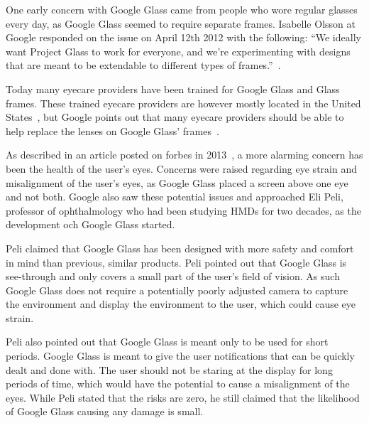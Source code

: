 One early concern with Google Glass came from people who wore regular glasses every day, as Google Glass seemed to require separate frames. Isabelle Olsson at Google responded on the issue on April 12th 2012 with the following: ``We ideally want Project Glass to work for everyone, and we're experimenting with designs that are meant to be extendable to different types of frames.''~\cite{GoogleGlassFrameResponse}.

Today many eyecare providers have been trained for Google Glass and Glass frames. These trained eyecare providers are however mostly located in the United States~\cite{frameProviders}, but Google points out that many eyecare providers should be able to help replace the lenses on Google Glass' frames~\cite{framesGlass}.

As described in an article posted on forbes in 2013~\cite{ackerman13}, a more alarming concern has been the health of the user's eyes. Concerns were raised regarding eye strain and misalignment of the user's eyes, as Google Glass placed a screen above one eye and not both. Google also saw these potential issues and approached Eli Peli, professor of ophthalmology who had been studying HMDs for two decades, as the development och Google Glass started.

Peli claimed that Google Glass has been designed with more safety and comfort in mind than previous, similar products. Peli pointed out that Google Glass is see-through and only covers a small part of the user's field of vision. As such Google Glass does not require a potentially poorly adjusted camera to capture the environment and display the environment to the user, which could cause eye strain.

Peli also pointed out that Google Glass is meant only to be used for short periods. Google Glass is meant to give the user notifications that can be quickly dealt and done with. The user should not be staring at the display for long periods of time, which would have the potential to cause a misalignment of the eyes. While Peli stated that the risks are zero, he still claimed that the likelihood of Google Glass causing any damage is small.

